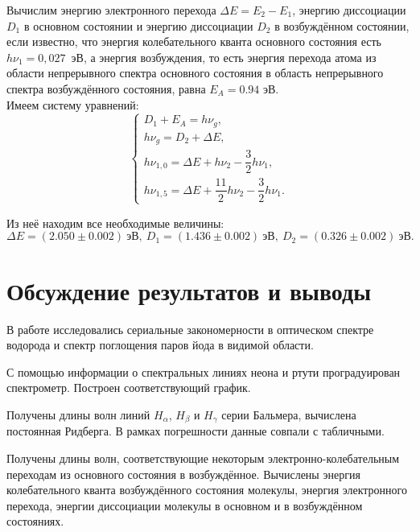 \documentclass[a4paper,12pt]{article} %
\begin{document}
		Вычислим энергию электронного перехода $\Delta E=E_2-E_1$, энергию диссоциации $D_1$ в основном состоянии и энергию диссоциации $D_2$ в возбуждённом состоянии, если известно, что энергия колебательного кванта основного состояния есть $h\nu_1=0,027$~эВ, а энергия возбуждения, то есть энергия перехода атома из области непрерывного спектра основного состояния в область непрерывного спектра возбуждённого состояния, равна $E_A=0.94$ эВ.\\
		Имеем систему уравнений:
		\begin{equation*}
			\begin{cases}
				D_1+E_A=h \nu_g,\\
				h\nu_g=D_2+\Delta E,\\
				h\nu_{1,0}=\Delta E+h\nu_2-\dfrac{3}{2}h\nu_1,\\
					h\nu_{1,5}=\Delta E+\dfrac{11}{2}h\nu_2-\dfrac{3}{2}h\nu_1.
			\end{cases}
		\end{equation*}

		Из неё находим все необходимые величины:
		\[\boxed{\Delta E=(2.050\pm 0.002) \ \text{эВ}, \ D_1=(1.436\pm 0.002)\  \text{эВ}, \  D_2=(0.326 \pm 0.002) \ \text{эВ}.}\]

\section{Обсуждение результатов и выводы}
	В работе исследовались сериальные закономерности в оптическом спектре водорода и спектр поглощения паров йода в видимой области.
	
	С помощью информации о спектральных линиях неона и ртути проградуирован спектрометр. Построен соответствующий график.
	
	Получены длины волн линий $H_{\alpha}$, $H_{\beta}$ и $H_{\gamma}$ серии Бальмера, вычислена постоянная Ридберга. В рамках погрешности данные совпали с табличными.
	
	Получены длины волн, соответствующие некоторым электронно-колебательным переходам из основного состояния в возбуждённое. Вычислены энергия колебательного кванта возбуждённого состояния молекулы, энергия электронного перехода, энергии диссоциации молекулы в основном и в возбуждённом состояниях.
\end{document}
